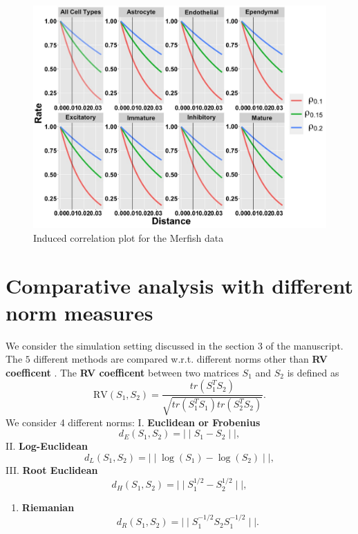 \documentclass[
]{book}
\providecommand{\tightlist}{%
  \setlength{\itemsep}{0pt}\setlength{\parskip}{0pt}}
\begin{document}
\begin{figure}

{\centering \includegraphics[width=0.8\linewidth]{images/Merfish_induced_correlation_final} 

}

\caption{Induced correlation plot for the Merfish data}\label{fig:induceCORR}
\end{figure}

\hypertarget{comparative-analysis-with-different-norm-measures}{%
\section{Comparative analysis with different norm measures}\label{comparative-analysis-with-different-norm-measures}}

We consider the simulation setting discussed in the section 3 of the manuscript. The \(5\) different methods are compared w.r.t. different norms other than \textbf{RV coefficent} \citep{robert1976unifying}. The \textbf{RV coefficent} between two matrices \(S_{1}\) and \(S_{2}\) is defined as \[\text{RV}(S_{1},S_{2}) = \frac{ tr(  S_{1}^{T} S_{2} ) }{ \sqrt{ tr(  S_{1}^{T} S_{1} )  tr(  S_{2}^{T} S_{2} ) }  }.\] We consider 4 different norms:
I. \textbf{Euclidean or Frobenius}
\[
d_{E}(S_{1},S_{2}) = \mid \mid S_{1} - S_{2} \mid \mid, 
\]
II. \textbf{Log-Euclidean}
\[
d_{L}(S_{1},S_{2}) = \mid \mid \log(S_{1}) - \log(S_{2}) \mid \mid,
\]
III. \textbf{Root Euclidean}
\[
d_{H}(S_{1},S_{2}) = \mid \mid S_{1}^{1/2} - S_{2}^{1/2} \mid \mid, 
\]

\begin{enumerate}
\def\labelenumi{\Roman{enumi}.}
\setcounter{enumi}{3}
\tightlist
\item
  \textbf{Riemanian}
  \[
  d_{R}(S_{1},S_{2}) = \mid \mid S_{1}^{-1/2} S_{2} S_{1}^{-1/2} \mid \mid.
  \]
\end{enumerate}
\end{document}
